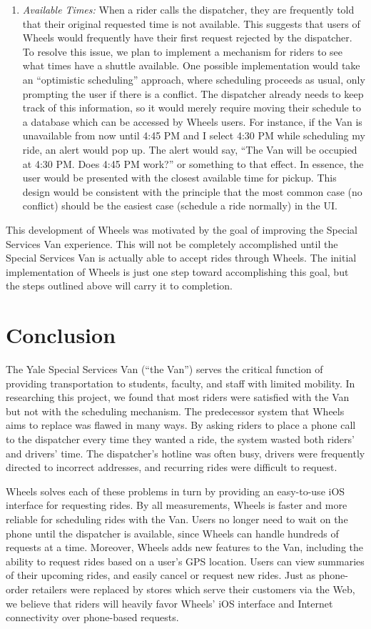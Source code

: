 \documentclass[12pt, a4paper]{article}
\begin{document}
\begin{multicols*}{2}
\begin{enumerate}[label=(\roman*)]
	\item \textit{Available Times:} When a rider calls the dispatcher, they are frequently told that their original requested time is not available. This suggests that users of Wheels would frequently have their first request rejected by the dispatcher. To resolve this issue, we plan to implement a mechanism for riders to see what times have a shuttle available. One possible implementation would take an ``optimistic scheduling'' approach, where scheduling proceeds as usual, only prompting the user if there is a conflict. The dispatcher already needs to keep track of this information, so it would merely require moving their schedule to a database which can be accessed by Wheels users. For instance, if the Van is unavailable from now until 4:45 PM and I select 4:30 PM while scheduling my ride, an alert would pop up. The alert would say, ``The Van will be occupied at 4:30 PM. Does 4:45 PM work?'' or something to that effect. In essence, the user would be presented with the closest available time for pickup. This design would be consistent with the principle that the most common case (no conflict) should be the easiest case (schedule a ride normally) in the UI.
\end{enumerate}
This development of Wheels was motivated by the goal of improving the Special Services Van experience. This will not be completely accomplished until the Special Services Van is actually able to accept rides through Wheels. The initial implementation of Wheels is just one step toward accomplishing this goal, but the steps outlined above will carry it to completion.

\section{Conclusion}\label{sec:conclusion}
The Yale Special Services Van (``the Van'') serves the critical function of providing transportation to students, faculty, and staff with limited mobility. In researching this project, we found that most riders were satisfied with the Van but not with the scheduling mechanism. The predecessor system that Wheels aims to replace was flawed in many ways. By asking riders to place a phone call to the dispatcher every time they wanted a ride, the system wasted both riders' and drivers' time. The dispatcher's hotline was often busy, drivers were frequently directed to incorrect addresses, and recurring rides were difficult to request.

Wheels solves each of these problems in turn by providing an easy-to-use iOS interface for requesting rides. By all measurements, Wheels is faster and more reliable for scheduling rides with the Van. Users no longer need to wait on the phone until the dispatcher is available, since Wheels can handle hundreds of requests at a time. Moreover, Wheels adds new features to the Van, including the ability to request rides based on a user's GPS location. Users can view summaries of their upcoming rides, and easily cancel or request new rides. Just as phone-order retailers were replaced by stores which serve their customers via the Web, we believe that riders will heavily favor Wheels' iOS interface and Internet connectivity over phone-based requests.

\end{multicols*}
\end{document}
